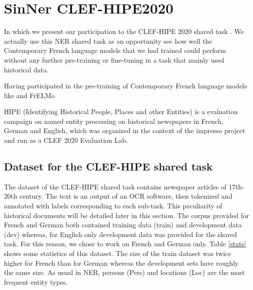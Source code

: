 \chapter{SinNer CLEF-HIPE2020}

\begin{center}
    \begin{minipage}{0.66\textwidth}
        \begin{small}
            In which we present our participation \citep{ortiz-suarez-etal-2020-sinner} to the CLEF-HIPE 2020 shared task \citep{ehrmann-etal-2020-extended}. We actually use this NER shared task as an opportunity see how well the Contemporary French language models that we had trained could perform without any further pre-training or fine-tuning in a task that mainly used historical data.
        \end{small}
    \end{minipage}
    \vspace{0.5cm}
\end{center}

Having participated in the pre-training of Contemporary French language models like \camembert \citep{martin-etal-2020-camembert} and FrELMo \citep{ortiz-suarez-etal-2020-establishing,popa-fabre-etal-2020-french}

HIPE (Identifying Historical People, Places and other Entities) is a evaluation campaign on named entity processing on historical newspapers in French, German and English, which was organized in the context of the impresso project and run as a CLEF 2020 Evaluation Lab.

\section{Dataset for the CLEF-HIPE shared task}
\label{sec:dataset}

The dataset of the CLEF-HIPE shared task contains newspaper articles of 17th-20th century. The text is an output of an OCR software, then tokenized and annotated with labels corresponding to each sub-task. This peculiarity of historical documents will be detailed later in this section.
The corpus provided for French and German both contained training data (train) and development data (dev) whereas, for English only development data was provided for the shared task. For this reason, we chose to work on French and German only.
Table \ref{stats} shows some statistics of this dataset. The size of the train dataset was twice higher for French than for German whereas the development sets have roughly the same size. As usual in NER, persons (Pers) and locations (Loc) are the most frequent entity types.


